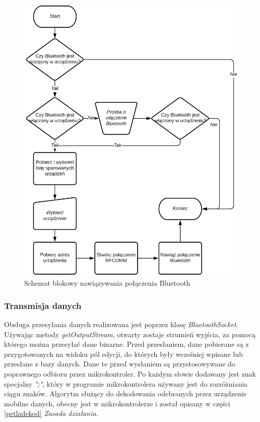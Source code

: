 \documentclass[a4paper,12pt, twoside]{article}
\begin{document}
    	\begin{figure}[H]
    	        \centering
    			\includegraphics[width=12cm]{images/rys_12bluetoothconnection.png}
    			\caption{Schemat blokowy nawiązywania połączenia Bluetooth}
                \label{fig:btconnect}
    	\end{figure}
    	
    	\subsubsection{Transmisja danych}
    	Obsługa przesyłania danych realizowana jest poprzez klasę \textit{BluetoothSocket}. Używając metody \textit{getOutputStream}\cite{outputstream}, otwarty zostaje strumień wyjścia, za pomocą którego można przesyłać dane binarne. Przed przesłaniem, dane pobierane są z przygotowanych na widoku pól edycji, do których były wcześniej wpisane lub przesłane z bazy danych. Dane te przed wysłaniem są przystosowywane do poprawnego odbioru przez mikrokontroler. Po każdym słowie dodawany jest znak specjalny \textit{";"}, który w programie mikrokontrolera używany jest do rozróżniania ciągu znaków. Algorytm służący do dekodowania odebranych przez urządzenie mobilne danych, obecny jest w mikrokontrolerze i został opisany w części \ref{petladekod} \textit{Zasada działania}.
    	
\end{document}
